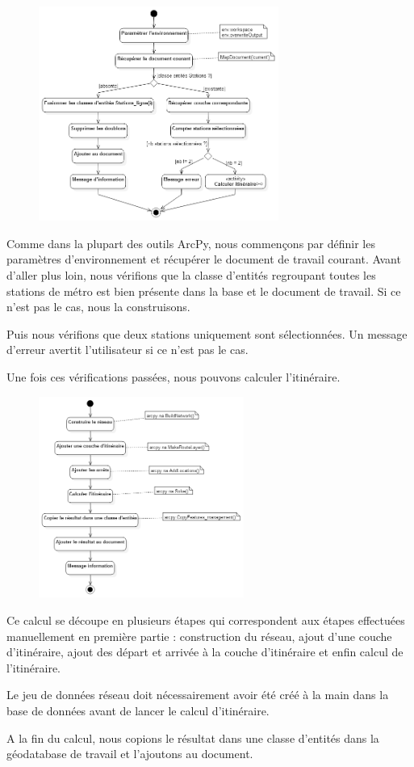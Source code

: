 \documentclass[11pt]{article}
\begin{document}
\begin{figure}[H]
	\center \includegraphics[width=0.7\textwidth]{img/td3b/diagramme_activite_general.png} \\
\end{figure}

Comme dans la plupart des outils ArcPy, nous commençons par définir les paramètres d'environnement et récupérer le document de travail courant. Avant d'aller plus loin, nous vérifions que la classe d'entités regroupant toutes les stations de métro est bien présente dans la base et le document de travail. Si ce n'est pas le cas, nous la construisons.

Puis nous vérifions que deux stations uniquement sont sélectionnées. Un message d'erreur avertit l'utilisateur si ce n'est pas le cas.

Une fois ces vérifications passées, nous pouvons calculer l'itinéraire.

\begin{figure}[H]
	\center \includegraphics[width=0.6\textwidth]{img/td3b/diagramme_activite_calcul_itineraire.png} \\
\end{figure}

Ce calcul se découpe en plusieurs étapes qui correspondent aux étapes effectuées manuellement en première partie : construction du réseau, ajout d'une couche d'itinéraire, ajout des départ et arrivée à la couche d'itinéraire et enfin calcul de l'itinéraire.

Le jeu de données réseau doit nécessairement avoir été créé à la main dans la base de données avant de lancer le calcul d'itinéraire.

A la fin du calcul, nous copions le résultat dans une classe d'entités dans la géodatabase de travail et l'ajoutons au document.
\end{document}
